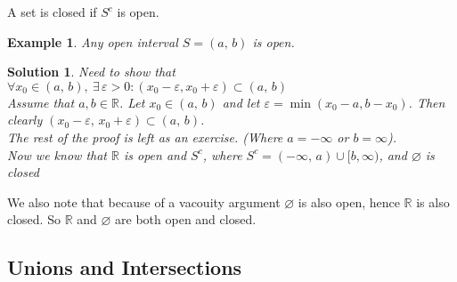 \documentclass{article}
\newcommand{\R}{\mathbb{R}}
\newcommand{\sub}{\subset}
\newcommand{\e}{\varepsilon}
\newcommand{\ex}{\exists\,}
\newtheorem{example}{Example}
\newtheorem{solution}{Solution}
\begin{document}
\begin{definition}{}{}
 A set is {\color{blue} closed } if $S^c$ is open.
\end{definition}\vspace{10pt}

\begin{example}{
 Any open interval $S= (a,\,b)$ is open.\\
}\end{example}\begin{solution}{
Need to show that $\displaystyle{\forall x_0\in(a,\, b), \: \ex \e>0: (x_0 - \e, x_0+\e)\sub (a,\,b)}$\\
Assume that $\displaystyle{a, b \in \R}$. Let $\displaystyle{x_0\in(a,\,b)}$ and let $\e = \min (x_0 - a, b - x_0)$. Then clearly $\displaystyle{(x_0-\e,\, x_0+\e)\sub (a,\, b)}$. \\
The rest of the proof is left as an exercise. (Where $a = -\infty$ or $b=\infty$).\\
Now we know that $\R$ is open and $S^c$, where $S^c = (-\infty,\, a)\cup[b, \infty)$, and $\varnothing$ is closed
}\end{solution}\vspace{10pt}

We also note that because of a vacouity argument $\varnothing$ is also open, hence $\displaystyle{\R}$ is also closed. So $\displaystyle{\R}$ and $\displaystyle{\varnothing}$ are both open and closed.

\subsection{Unions and Intersections}
\end{document}
